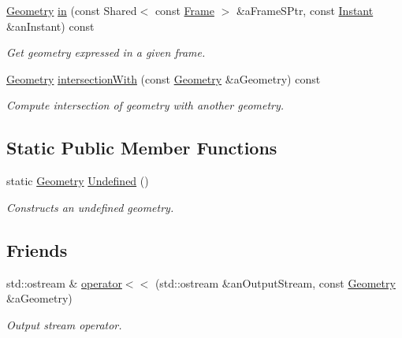 \begin{DoxyCompactItemize}
\hyperlink{classostk_1_1physics_1_1env_1_1object_1_1_geometry}{Geometry} \hyperlink{classostk_1_1physics_1_1env_1_1object_1_1_geometry_ac9d7aa217eb0ec8d0dff7270ca2d0447}{in} (const Shared$<$ const \hyperlink{classostk_1_1physics_1_1coord_1_1_frame}{Frame} $>$ \&a\+Frame\+S\+Ptr, const \hyperlink{classostk_1_1physics_1_1time_1_1_instant}{Instant} \&an\+Instant) const
\begin{DoxyCompactList}\small\item\em Get geometry expressed in a given frame. \end{DoxyCompactList}\item 
\hyperlink{classostk_1_1physics_1_1env_1_1object_1_1_geometry}{Geometry} \hyperlink{classostk_1_1physics_1_1env_1_1object_1_1_geometry_aee148ec3c78756b373d2e3b31ee2a34a}{intersection\+With} (const \hyperlink{classostk_1_1physics_1_1env_1_1object_1_1_geometry}{Geometry} \&a\+Geometry) const
\begin{DoxyCompactList}\small\item\em Compute intersection of geometry with another geometry. \end{DoxyCompactList}\end{DoxyCompactItemize}
\subsection*{Static Public Member Functions}
\begin{DoxyCompactItemize}
\item 
static \hyperlink{classostk_1_1physics_1_1env_1_1object_1_1_geometry}{Geometry} \hyperlink{classostk_1_1physics_1_1env_1_1object_1_1_geometry_a5954c3485fd2a21b1d1419e08a6dcc4e}{Undefined} ()
\begin{DoxyCompactList}\small\item\em Constructs an undefined geometry. \end{DoxyCompactList}\end{DoxyCompactItemize}
\subsection*{Friends}
\begin{DoxyCompactItemize}
\item 
std\+::ostream \& \hyperlink{classostk_1_1physics_1_1env_1_1object_1_1_geometry_aebfe5b9b5d8cd3dd8a2cfd140a1df583}{operator$<$$<$} (std\+::ostream \&an\+Output\+Stream, const \hyperlink{classostk_1_1physics_1_1env_1_1object_1_1_geometry}{Geometry} \&a\+Geometry)
\begin{DoxyCompactList}\small\item\em Output stream operator. \end{DoxyCompactList}\end{DoxyCompactItemize}


